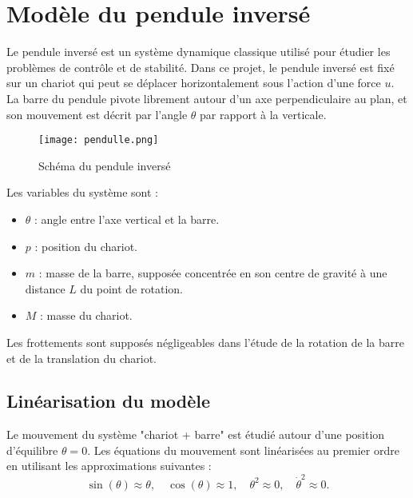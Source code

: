 \documentclass{report}
\begin{document}
\section{Modèle du pendule inversé}

Le pendule inversé est un système dynamique classique utilisé pour étudier les problèmes de contrôle et de stabilité. Dans ce projet, le pendule inversé est fixé sur un chariot qui peut se déplacer horizontalement sous l'action d'une force \( u \). La barre du pendule pivote librement autour d'un axe perpendiculaire au plan, et son mouvement est décrit par l'angle \( \theta \) par rapport à la verticale.

\begin{figure}[h!]
    \centering
    \texttt{[image: pendulle.png]} %
    \caption{Schéma du pendule inversé}
    \label{fig:pendule}
\end{figure}

Les variables du système sont :
\begin{itemize}
    \item \( \theta \) : angle entre l'axe vertical et la barre.
    \item \( p \) : position du chariot.
    \item \( m \) : masse de la barre, supposée concentrée en son centre de gravité à une distance \( L \) du point de rotation.
    \item \( M \) : masse du chariot.
\end{itemize}

Les frottements sont supposés négligeables dans l'étude de la rotation de la barre et de la translation du chariot.

\subsection{Linéarisation du modèle}

Le mouvement du système "chariot + barre" est étudié autour d'une position d'équilibre \( \theta = 0 \). Les équations du mouvement sont linéarisées au premier ordre en utilisant les approximations suivantes :
\[
\sin(\theta) \approx \theta, \quad \cos(\theta) \approx 1, \quad \theta^2 \approx 0, \quad \dot{\theta}^2 \approx 0.
\]
\end{document}
